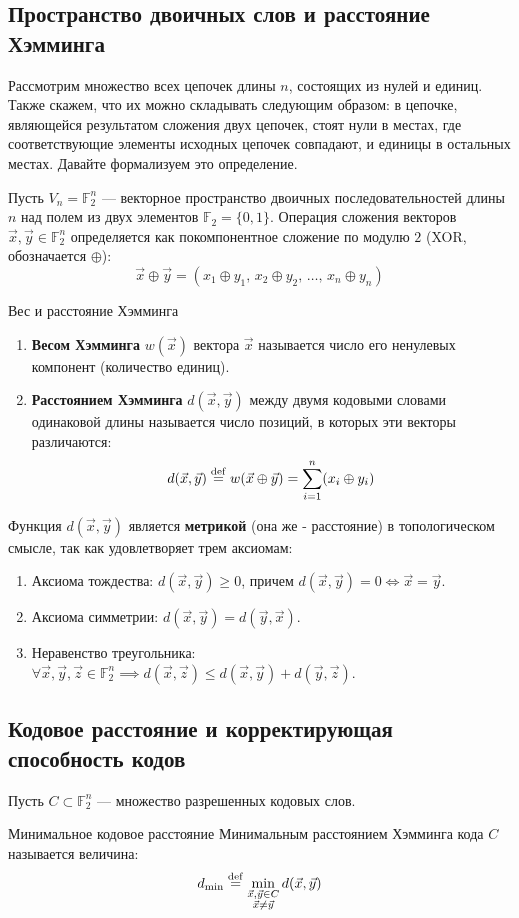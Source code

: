 \documentclass[11pt,a4paper]{article}
\begin{document}
\subsection{Пространство двоичных слов и расстояние Хэмминга}
Рассмотрим множество всех цепочек длины $n$, состоящих из нулей и единиц. Также скажем, что их можно складывать следующим образом: в цепочке, являющейся результатом сложения двух цепочек, стоят нули в местах, где соответствующие элементы исходных цепочек совпадают, и единицы в остальных местах. Давайте формализуем это определение.

Пусть $V_n = \mathbb{F}_2^n$ --- векторное пространство двоичных последовательностей длины $n$ над полем из двух элементов $\mathbb{F}_2 = \{0, 1\}$. Операция сложения векторов $\vec{x}, \vec{y} \in \mathbb{F}_2^n$ определяется как покомпонентное сложение по модулю $2$ (XOR, обозначается $\oplus$):
$$\vec{x} \oplus \vec{y} = (x_1 \oplus y_1, \, x_2 \oplus y_2, \, \dots, \, x_n \oplus y_n)$$

\begin{definitionbox}{Вес и расстояние Хэмминга}
\begin{enumerate}
    \item \textbf{Весом Хэмминга} $w(\vec{x})$ вектора $\vec{x}$ называется число его ненулевых компонент (количество единиц).
    \item \textbf{Расстоянием Хэмминга} $d(\vec{x}, \vec{y})$ между двумя кодовыми словами одинаковой длины называется число позиций, в которых эти векторы различаются:
    $$d(\vec{x}, \vec{y}) \overset{\mathrm{def}}{=} w(\vec{x} \oplus \vec{y}) = \sum_{i=1}^n (x_i \oplus y_i)$$
\end{enumerate}
\end{definitionbox}

Функция $d(\vec{x}, \vec{y})$ является \textbf{метрикой} (она же - расстояние) в топологическом смысле, так как удовлетворяет трем аксиомам:
\begin{enumerate}
    \item Аксиома тождества: $d(\vec{x}, \vec{y}) \ge 0$, причем $d(\vec{x}, \vec{y}) = 0 \iff \vec{x} = \vec{y}$.
    \item Аксиома симметрии: $d(\vec{x}, \vec{y}) = d(\vec{y}, \vec{x})$.
    \item Неравенство треугольника: $\forall \vec{x}, \vec{y}, \vec{z} \in \mathbb{F}_2^n \implies d(\vec{x}, \vec{z}) \le d(\vec{x}, \vec{y}) + d(\vec{y}, \vec{z})$.
\end{enumerate}

\subsection{Кодовое расстояние и корректирующая способность кодов}
Пусть $C \subset \mathbb{F}_2^n$ --- множество разрешенных кодовых слов. 
\begin{definitionbox}{Минимальное кодовое расстояние}
Минимальным расстоянием Хэмминга кода $C$ называется величина:
$$d_{\min} \overset{\mathrm{def}}{=} \min_{\substack{\vec{x}, \vec{y} \in C \\ \vec{x} \neq \vec{y}}} d(\vec{x}, \vec{y})$$
\end{definitionbox}
\end{document}
